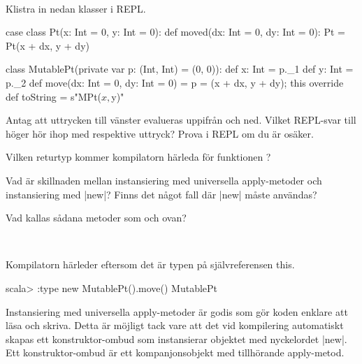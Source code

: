 
\QUESTBEGIN

\Task \what~\\Klistra in nedan klasser i REPL.

\begin{Code}
case class Pt(x: Int = 0, y: Int = 0):
  def moved(dx: Int = 0, dy: Int = 0): Pt = Pt(x + dx, y + dy)

class MutablePt(private var p: (Int, Int) = (0, 0)):
  def x: Int = p._1
  def y: Int = p._2
  def move(dx: Int = 0, dy: Int = 0) = { p = (x + dx, y + dy); this }
  override def toString = s"MPt($x,$y)"
\end{Code}

\Subtask
Antag att uttrycken till vänster evalueras uppifrån och ned. Vilket REPL-svar till höger hör ihop med respektive uttryck? Prova i REPL om du är osäker.

\begin{ConceptConnections}

\end{ConceptConnections}

\Subtask Vilken returtyp kommer kompilatorn härleda för funktionen ?

\Subtask Vad är skillnaden mellan instansiering med universella apply-metoder och instansiering med \code|new|? Finns det något fall där \code|new| måste användas?

\Subtask Vad kallas sådana metoder som  och  ovan?

\SOLUTION

\TaskSolved \what~

\SubtaskSolved

\begin{ConceptConnections}

\end{ConceptConnections}


\SubtaskSolved Kompilatorn härleder  eftersom det är typen på självreferensen this.
\begin{REPL}
scala> :type new MutablePt().move()
MutablePt
\end{REPL}

\SubtaskSolved
Instansiering med universella apply-metoder  är godis som gör koden enklare att läsa och skriva. Detta är möjligt tack vare att det vid kompilering automatiskt skapas ett konstruktor-ombud  som instansierar objektet med nyckelordet \code|new|. Ett konstruktor-ombud är ett kompanjonsobjekt med tillhörande apply-metod.

